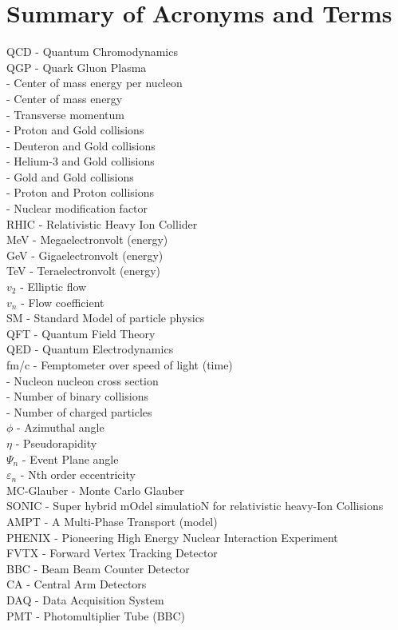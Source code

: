 \chapter{Summary of Acronyms and Terms}	\OnePageChapter         %
\noindent
QCD - Quantum Chromodynamics\\
QGP - Quark Gluon Plasma\\
\sqsn - Center of mass energy per nucleon\\
\sqs - Center of mass energy\\
\pt  - Transverse momentum\\
\pau  - Proton and Gold collisions\\
\dau  - Deuteron and Gold collisions\\
\hau  - Helium-3 and Gold collisions\\
\auau  - Gold and Gold collisions\\
\pp  - Proton and Proton collisions\\
\raa  - Nuclear modification factor\\
RHIC - Relativistic Heavy Ion Collider\\
MeV - Megaelectronvolt (energy)\\
GeV - Gigaelectronvolt (energy)\\
TeV - Teraelectronvolt (energy)\\
$v_2$ - Elliptic flow\\
$v_n$ - Flow coefficient\\
SM - Standard Model of particle physics\\
QFT - Quantum Field Theory\\
QED - Quantum Electrodynamics\\
fm/c - Femptometer over speed of light (time)\\
\signn - Nucleon nucleon cross section\\
\Ncoll - Number of binary collisions\\
\Nch - Number of charged particles\\
$\phi$ - Azimuthal angle\\
$\eta$ - Pseudorapidity\\
$\Psi_n$ - Event Plane angle\\
$\varepsilon_n$ - Nth order eccentricity\\
MC-Glauber - Monte Carlo Glauber\\
SONIC - Super hybrid mOdel simulatioN for relativistic heavy-Ion Collisions\\
AMPT - A Multi-Phase Transport (model)\\
PHENIX - Pioneering High Energy Nuclear Interaction Experiment\\
FVTX - Forward Vertex Tracking Detector\\
BBC - Beam Beam Counter Detector\\
CA - Central Arm Detectors\\
DAQ - Data Acquisition System\\
PMT - Photomultiplier Tube (BBC)
